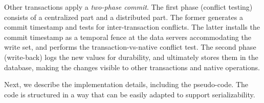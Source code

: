 Other transactions apply a \emph{two-phase commit}.
The first phase (conflict testing) consists of a centralized part and a distributed 
part. The former generates a commit timestamp 
and tests for inter-transaction conflicts. The latter installs the commit timestamp 
as a temporal fence at the data servers accommodating the write set, and
performs the transaction-vs-native conflict test. The second phase (write-back) logs the new values 
for durability, and ultimately stores them in the database, making the changes 
visible to other transactions and native operations.

%


Next, we describe the implementation details, including 
the pseudo-code.
The code is structured in a way that can be easily adapted to support 
serializability.%

